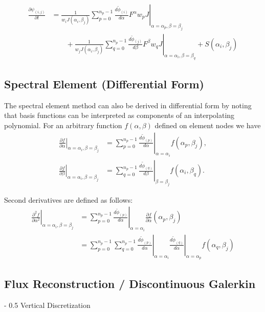 \documentclass{article}
\makeatletter
\renewcommand\section{\@startsection
  {section}{2}{0mm}%
  {-\baselineskip}%
  {0.5\baselineskip}%
  {\normalfont\Huge\bfseries}}%
\newcommand{\diff}[2]{\frac{d #1}{d #2}}
\newcommand{\pdiff}[2]{\frac{\partial #1}{\partial #2}}
\makeatother
\begin{document}
\begin{align}
\pdiff{\psi_{(i,j)}}{t} &= \frac{1}{w_i J(\alpha_i, \beta_j)} \sum_{p = 0}^{n_p-1} \left. \diff{\tilde{\phi}_{(i)}}{\alpha} F^\alpha w_p J \right\vert_{\alpha = \alpha_p, \beta = \beta_j} \nonumber \\
& \qquad + \frac{1}{w_j J(\alpha_i, \beta_j)} \sum_{q = 0}^{n_p-1} \left. \diff{\tilde{\phi}_{(j)}}{\beta} F^\beta w_q J \right\vert_{\alpha = \alpha_i, \beta = \beta_q} + S(\alpha_i, \beta_j)
\end{align}

\subsection{Spectral Element (Differential Form)}

The spectral element method can also be derived in differential form by noting that basis functions can be interpreted as components of an interpolating polynomial.  For an arbitrary function $f(\alpha, \beta)$ defined on element nodes we have
\begin{align}
\left. \pdiff{f}{\alpha} \right\vert_{\alpha = \alpha_i, \beta = \beta_j} &= \sum_{p=0}^{n_p-1} \left. \diff{\tilde{\phi}_{(p)}}{\alpha} \right\vert_{\alpha = \alpha_i} f(\alpha_p, \beta_j), \\
\left. \pdiff{f}{\beta} \right\vert_{\alpha = \alpha_i, \beta = \beta_j} &= \sum_{q=0}^{n_p-1} \left. \diff{\tilde{\phi}_{(q)}}{\beta} \right\vert_{\beta = \beta_j} f(\alpha_i, \beta_q).
\end{align}

Second derivatives are defined as follows:
\begin{align}
\left. \frac{\partial^2 f}{\partial \alpha^2} \right\vert_{\alpha = \alpha_i, \beta = \beta_j} &= \sum_{p=0}^{n_p-1} \left. \diff{\tilde{\phi}_{(p)}}{\alpha} \right\vert_{\alpha = \alpha_i} \pdiff{f}{\alpha}(\alpha_p, \beta_j) \\
&= \sum_{p=0}^{n_p-1} \sum_{q=0}^{n_p-1} \left. \diff{\tilde{\phi}_{(p)}}{\alpha} \right\vert_{\alpha = \alpha_i} \left. \diff{\tilde{\phi}_{(q)}}{\alpha} \right\vert_{\alpha = \alpha_p} f(\alpha_q, \beta_j)
\end{align}

\subsection{Flux Reconstruction / Discontinuous Galerkin}

\section{Vertical Discretization}
\end{document}
